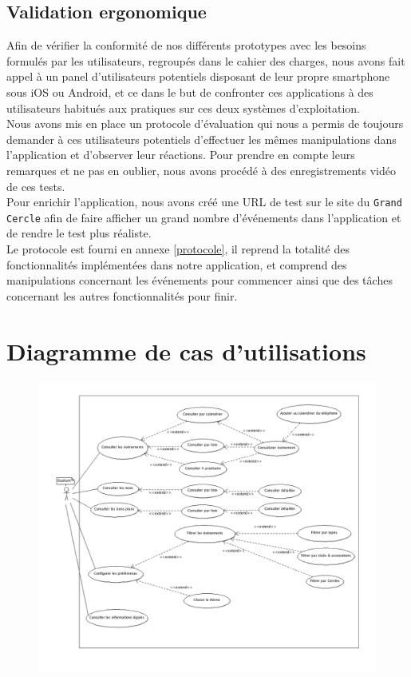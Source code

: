 \documentclass[a4paper, 11px]{article}
\begin{document}
\subsection{Validation ergonomique}
Afin de vérifier la conformité de nos différents prototypes avec les besoins formulés par les utilisateurs, regroupés dans le cahier des charges, nous avons fait appel à un panel d'utilisateurs potentiels disposant de leur propre smartphone sous iOS ou Android, et ce dans le but de confronter ces applications à des utilisateurs habitués aux pratiques sur ces deux systèmes d'exploitation.\\

Nous avons mis en place un protocole d'évaluation qui nous a permis de toujours demander à ces utilisateurs potentiels d'effectuer les mêmes manipulations dans l'application et d'observer leur réactions. Pour prendre en compte leurs remarques et ne pas en oublier, nous avons procédé à des enregistrements vidéo de ces tests.\\
Pour enrichir l'application, nous avons créé une URL de test sur le site du \texttt{Grand Cercle} afin de faire afficher un grand nombre d'événements dans l'application et de rendre le test plus réaliste.\\

Le protocole est fourni en annexe \ref{protocole}, il reprend la totalité des fonctionnalités implémentées dans notre application, et comprend des manipulations concernant les événements pour commencer ainsi que des tâches concernant les autres fonctionnalités pour finir.


\appendix
\addappheadtotoc

\newpage
\section{Diagramme de cas d'utilisations}
\label{cas_util}
\begin{figure}[h!]
\includegraphics[width=19cm]{cas_utilisation.png}
\end{figure}
\newpage
\end{document}
